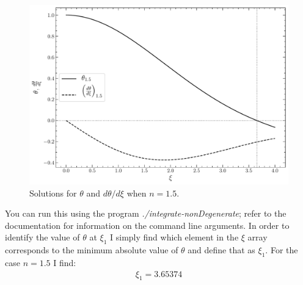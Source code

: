 \begin{figure}
    \centering
    \includegraphics[scale=0.6]{Graphics/ThetaXi.pdf}
    \caption{Solutions for $\theta$ and $d\theta/d\xi$ when $n=1.5$.}
    \label{fig:p2a}
\end{figure}
You can run this using the program \textit{./integrate-nonDegenerate}; refer to the documentation for information on the command line arguments. In order to identify the value of $\theta$ at $\xi_{1}$ I simply find which element in the $\xi$ array corresponds to the minimum absolute value of $\theta$ and define that as $\xi_{1}$. For the case $n=1.5$ I find:
\begin{align*}
    \xi_{1} = 3.65374
\end{align*}

